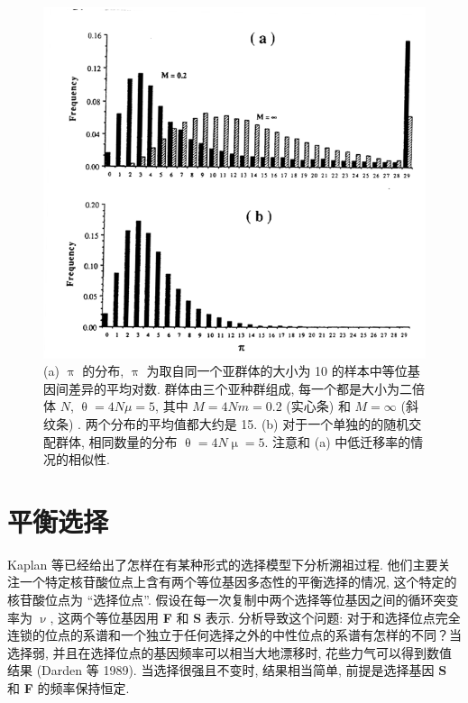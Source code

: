 \documentclass[12pt]{article}
\begin{document}
\begin{figure}
    \centering
    \includegraphics{coalescent-process.images/image7.png}
    \caption{
        (a) $\uppi$ 的分布, $\uppi$ 为取自同一个亚群体的大小为 10 的样本中等位基因间差异的平均对数. 群体由三个亚种群组成,
        每一个都是大小为二倍体 $N$, $\uptheta =4N\mu =5$, 其中 $M=4Nm=0.2$ (实心条) 和 $M=\mathrm{\infty}$ (斜纹条) .
        两个分布的平均值都大约是 15.
        (b) 对于一个单独的的随机交配群体, 相同数量的分布 $\uptheta =4N\upmu =5$. 注意和 (a) 中低迁移率的情况的相似性.
    }
    \label{fig:7}
\end{figure}

\section{平衡选择}

Kaplan 等已经给出了怎样在有某种形式的选择模型下分析溯祖过程.
他们主要关注一个特定核苷酸位点上含有两个等位基因多态性的平衡选择的情况, 这个特定的核苷酸位点为 ``选择位点''.
假设在每一次复制中两个选择等位基因之间的循环突变率为 $\upnu$, 这两个等位基因用 \textbf{F} 和 \textbf{S} 表示.
分析导致这个问题: 对于和选择位点完全连锁的位点的系谱和一个独立于任何选择之外的中性位点的系谱有怎样的不同？当选择弱,
并且在选择位点的基因频率可以相当大地漂移时, 花些力气可以得到数值结果 (Darden 等 1989). 当选择很强且不变时,
结果相当简单, 前提是选择基因 \textbf{S} 和 \textbf{F} 的频率保持恒定.
\end{document}
